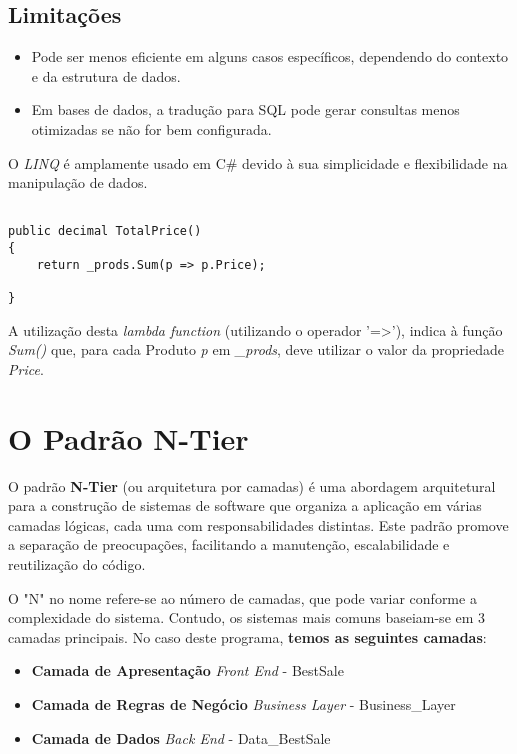 \documentclass[11pt]{scrartcl} %
\begin{document}
\subsection{Limitações}
\begin{itemize}
	\item Pode ser menos eficiente em alguns casos específicos, dependendo do contexto e da estrutura de dados.
	\item Em bases de dados, a tradução para SQL pode gerar consultas menos otimizadas se não for bem configurada.	
\end{itemize}

O \textit{LINQ} é amplamente usado em C\# devido à sua simplicidade e flexibilidade na manipulação de dados.

\newpage

\begin{lstlisting}[language={[Sharp]C}, caption={A Classe Cliente}, label={Classe Cliente}]
	
public decimal TotalPrice()
{
	return _prods.Sum(p => p.Price);
	
}
\end{lstlisting}

A utilização desta \textit{lambda function} (utilizando o operador '=>'), indica à função \textit{Sum()} que, para cada Produto \textit{p} em \textit{\_prods}, deve utilizar o valor da propriedade \textit{Price}.

\section{O Padrão N-Tier}
O padrão \textbf{N-Tier} (ou arquitetura por camadas) é uma abordagem arquitetural para a construção de sistemas de software que organiza a aplicação em várias camadas lógicas, cada uma com responsabilidades distintas. Este padrão promove a separação de preocupações, facilitando a manutenção, escalabilidade e reutilização do código.

O "N" no nome refere-se ao número de camadas, que pode variar conforme a complexidade do sistema. Contudo, os sistemas mais comuns baseiam-se em 3 camadas principais.
No caso deste programa, \textbf{temos as seguintes camadas}:
\begin{itemize}
	\item \textbf{Camada de Apresentação} \textit{Front End} - BestSale
	\item \textbf{Camada de Regras de Negócio} \textit{Business Layer} - Business\_Layer
	\item \textbf{Camada de Dados} \textit{Back End} - Data\_BestSale
\end{itemize}
\end{document}
